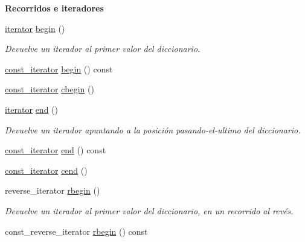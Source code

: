 \begin{Indent}{\bf \-Recorridos e iteradores}\par
\begin{DoxyCompactItemize}
\item 
\hyperlink{classaed2_1_1iterator_1_1iterator}{iterator} \hyperlink{classaed2_1_1iterator_af8901de173468531c58458b581d345a6_af8901de173468531c58458b581d345a6}{begin} ()
\begin{DoxyCompactList}\small\item\em \-Devuelve un iterador al primer valor del diccionario. \end{DoxyCompactList}\item 
\hyperlink{classaed2_1_1iterator_1_1const__iterator}{const\-\_\-iterator} \hyperlink{classaed2_1_1iterator_a102b6014e02bf9a1ed551f9cdea027d0_a102b6014e02bf9a1ed551f9cdea027d0}{begin} () const 
\item 
\hyperlink{classaed2_1_1iterator_1_1const__iterator}{const\-\_\-iterator} \hyperlink{classaed2_1_1iterator_a89cca73bd2e4df39de7c412c441d6da1_a89cca73bd2e4df39de7c412c441d6da1}{cbegin} ()
\item 
\hyperlink{classaed2_1_1iterator_1_1iterator}{iterator} \hyperlink{classaed2_1_1iterator_a67caf9468be999e9be96b7add5d79946_a67caf9468be999e9be96b7add5d79946}{end} ()
\begin{DoxyCompactList}\small\item\em \-Devuelve un iterador apuntando a la posición pasando-\/el-\/ultimo del diccionario. \end{DoxyCompactList}\item 
\hyperlink{classaed2_1_1iterator_1_1const__iterator}{const\-\_\-iterator} \hyperlink{classaed2_1_1iterator_ae08e4f49cbbd2dfa756609aceb431633_ae08e4f49cbbd2dfa756609aceb431633}{end} () const 
\item 
\hyperlink{classaed2_1_1iterator_1_1const__iterator}{const\-\_\-iterator} \hyperlink{classaed2_1_1iterator_a2d0d226485d9280d16a739d0b9dae525_a2d0d226485d9280d16a739d0b9dae525}{cend} ()
\item 
reverse\-\_\-iterator \hyperlink{classaed2_1_1iterator_a296638725dce2fc10316d18563eb3131_a296638725dce2fc10316d18563eb3131}{rbegin} ()
\begin{DoxyCompactList}\small\item\em \-Devuelve un iterador al primer valor del diccionario, en un recorrido al revés. \end{DoxyCompactList}\item 
const\-\_\-reverse\-\_\-iterator \hyperlink{classaed2_1_1iterator_ae6b990a72769289b9cd0236a91c3b43f_ae6b990a72769289b9cd0236a91c3b43f}{rbegin} () const 

\end{DoxyCompactItemize}
\end{Indent}

